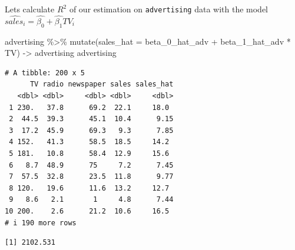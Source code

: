\documentclass[
  letterpaper,
  DIV=11,
  numbers=noendperiod]{scrreprt}
\newenvironment{Shaded}{\begin{snugshade}}{\end{snugshade}}
\newcommand{\AttributeTok}[1]{\textcolor[rgb]{0.65,0.35,0.00}{#1}}
\newcommand{\DecValTok}[1]{\textcolor[rgb]{0.47,0.16,0.63}{#1}}
\newcommand{\FunctionTok}[1]{\textcolor[rgb]{0.02,0.16,0.49}{#1}}
\newcommand{\NormalTok}[1]{\textcolor[rgb]{0.33,0.33,0.33}{#1}}
\newcommand{\OtherTok}[1]{\textcolor[rgb]{0.85,0.12,0.09}{#1}}
\newcommand{\SpecialCharTok}[1]{\textcolor[rgb]{0.00,0.46,0.62}{#1}}
\begin{document}
Lets calculate \(R^2\) of our estimation on \texttt{advertising} data
with the model \(\hat{sales_i} = \hat{\beta_0} + \hat{\beta_1}TV_i\)

\begin{Shaded}
\begin{Highlighting}[]
\NormalTok{advertising }\SpecialCharTok{\%\textgreater{}\%} 
  \FunctionTok{mutate}\NormalTok{(}\AttributeTok{sales\_hat =}\NormalTok{ beta\_0\_hat\_adv }\SpecialCharTok{+}\NormalTok{ beta\_1\_hat\_adv }\SpecialCharTok{*}\NormalTok{ TV) }\OtherTok{{-}\textgreater{}}\NormalTok{ advertising}
\NormalTok{advertising}
\end{Highlighting}
\end{Shaded}

\begin{verbatim}
# A tibble: 200 x 5
      TV radio newspaper sales sales_hat
   <dbl> <dbl>     <dbl> <dbl>     <dbl>
 1 230.   37.8      69.2  22.1     18.0 
 2  44.5  39.3      45.1  10.4      9.15
 3  17.2  45.9      69.3   9.3      7.85
 4 152.   41.3      58.5  18.5     14.2 
 5 181.   10.8      58.4  12.9     15.6 
 6   8.7  48.9      75     7.2      7.45
 7  57.5  32.8      23.5  11.8      9.77
 8 120.   19.6      11.6  13.2     12.7 
 9   8.6   2.1       1     4.8      7.44
10 200.    2.6      21.2  10.6     16.5 
# i 190 more rows
\end{verbatim}

\begin{Shaded}
\end{Shaded}

\begin{verbatim}
[1] 2102.531
\end{verbatim}

\begin{Shaded}
\end{Shaded}
\end{document}
